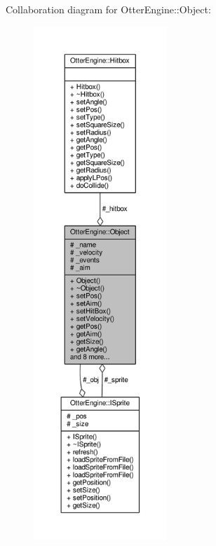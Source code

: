 Collaboration diagram for Otter\+Engine\+:\+:Object\+:\nopagebreak
\begin{figure}[H]
\begin{center}
\leavevmode
\includegraphics[height=550pt]{d1/d49/class_otter_engine_1_1_object__coll__graph}
\end{center}
\end{figure}
